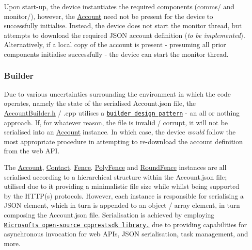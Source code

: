 Upon start-\/up, the device instantiates the required components (comms/ and monitor/), however, the \hyperlink{class_account}{Account} need not be present for the device to successfully initialise. Instead, the device does not start the monitor thread, but attempts to download the required J\+S\+ON account definition ({\itshape to be implemented}). Alternatively, if a local copy of the account is present -\/ presuming all prior components initialise successfully -\/ the device can start the monitor thread.

\subsubsection*{Builder}

Due to various uncertainties surrounding the environment in which the code operates, namely the state of the serialised Account.\+json file, the \hyperlink{_account_builder_8h}{Account\+Builder.\+h} / .cpp utilises a \href{https://sourcemaking.com/design_patterns/builder}{\tt builder design pattern} -\/ an all or nothing approach. If, for whatever reason, the file is invalid / corrupt, it will not be serialised into an \hyperlink{class_account}{Account} instance. In which case, the device {\itshape would} follow the most appropriate procedure in attempting to re-\/download the account definition from the web A\+PI.

The \hyperlink{class_account}{Account}, \hyperlink{class_contact}{Contact}, \hyperlink{class_fence}{Fence}, \hyperlink{class_poly_fence}{Poly\+Fence} and \hyperlink{class_round_fence}{Round\+Fence} instances are all serialised according to a hierarchical structure within the Account.\+json file; utilised due to it providing a minimalistic file size while whilst being supported by the H\+T\+T\+P(s) protocols. However, each instance is responsible for serialising a J\+S\+ON element, which in turn is appended to an object / array element, in turn composing the Account.\+json file. Serialisation is achieved by employing \href{https://github.com/microsoft/cpprestsdk}{\tt Microsoft\textquotesingle{}s open-\/source cpprestsdk library.} due to providing capabilities for asynchronous invocation for web A\+PI\textquotesingle{}s, J\+S\+ON serialisation, task management, and more. 